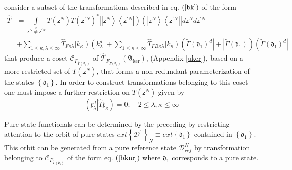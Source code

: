 \documentclass[aps,preprint]{revtex4}%
\begin{document}
consider a subset of the transformations described in eq. $\left(
\ref{bk}\right)  $ of the form
\begin{align}
\hat{T}  &  =%
{\displaystyle\int\limits_{\mathsf{z}^{N}\overset{2}{\neq}\mathsf{z}^{\prime
N}}}
T\left(  \mathsf{z}^{N}\right)  T\left(  \mathsf{z}^{\prime N}\right)  ^{\ast
}\left\vert \left\vert \mathsf{z}^{N}\right\rangle \left\langle \mathsf{z}%
^{\prime N}\right\vert \right)  \left(  \left\vert \mathsf{z}^{N}\right\rangle
\left\langle \mathsf{z}^{\prime N}\right\vert \right\vert d\mathsf{z}%
^{N}d\mathsf{z}^{\prime N}\nonumber\\
&  +%
{\displaystyle\sum\limits_{1\leq\kappa,\lambda\leq\infty}}
\hat{T}_{F\kappa\lambda}\left\vert k_{\kappa}\right)  \left(  k_{\lambda}%
^{d}\right\vert +%
{\displaystyle\sum\limits_{1\leq\kappa\leq\infty}}
\hat{T}_{FB\kappa\lambda}\left\vert k_{\kappa}\right)  \left(  \tilde{\Gamma
}\left(  \mathfrak{d}_{1}\right)  ^{d}\right\vert +\left\vert \tilde{\Gamma
}\left(  \mathfrak{d}_{1}\right)  \right)  \left(  \tilde{\Gamma}\left(
\mathfrak{d}_{1}\right)  ^{d}\right\vert \label{bknr}%
\end{align}
that produce a coset $\mathcal{C}_{F_{\tilde{\Gamma}\left(  \mathfrak{d}%
_{1}\right)  }}$ of $\mathcal{\hat{T}}_{F_{\tilde{\Gamma}\left(
\mathfrak{d}_{1}\right)  }}\left(  \mathfrak{A}_{\ker}\right)  $, (Appendix
\ref{uker}), based on a more restricted set of $T\left(  \mathsf{z}%
^{N}\right)  $, that forms a non redundant parameterization of the states
$\left\{  \mathfrak{d}_{1}\right\}  $. In order to construct transformations
belonging to this coset one must impose a further restriction on $T\left(
\mathsf{z}^{N}\right)  $ given by
\begin{equation}
\left(  \mathfrak{x}_{\lambda}^{d}\left\vert \hat{T}\right.  \mathfrak{x}%
_{\kappa}\right)  =0;\quad2\leq\lambda,\kappa\leq\infty
\end{equation}


Pure state functionals can be determined by the preceding by restricting
attention to the orbit of pure states $ext\left\{  \mathcal{D}^{1}\right\}
_{N}\equiv ext\left\{  \mathfrak{d}_{1}\right\}  $ contained in $\left\{
\mathfrak{d}_{1}\right\}  $. This orbit can be generated from a pure reference
state $\mathcal{D}_{ref}^{N}$ \cite{weiner2002} by transformation belonging to
$\mathcal{C}_{F_{\tilde{\Gamma}\left(  \mathfrak{d}_{1}\right)  }} $ of the
form eq. $\left(  \ref{bknr}\right)  $ where $\mathfrak{d}_{1}$ corresponds to
a pure state.
\end{document}
